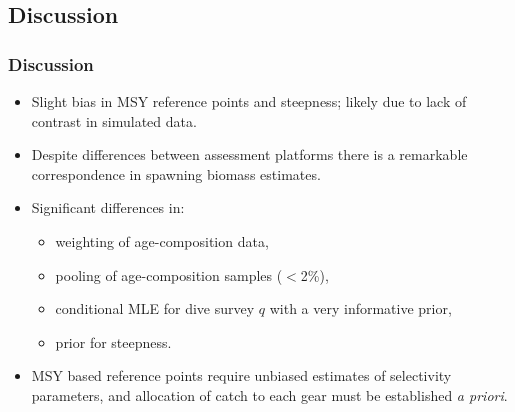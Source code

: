 \subsection{Discussion} %
\label{sub:discussion}
\begin{frame}[t]\frametitle{Discussion}
	\begin{itemize}
		\item<+-> Slight bias in MSY reference points and steepness; likely due to lack of contrast in simulated data.
		\item<+-> Despite differences between assessment platforms there is a remarkable correspondence in spawning biomass estimates.
		
		\item<+-> Significant differences in:
		\begin{itemize}
			\item weighting of age-composition data,
			\item pooling of age-composition samples ($<$2\%),
			\item conditional MLE for dive survey $q$ with a very informative prior,
			\item prior for steepness.
		\end{itemize}
		\item<+-> MSY based reference points require unbiased estimates of selectivity parameters, and allocation of catch to each gear must be established \textit{a priori}.
	\end{itemize}
\end{frame}






















